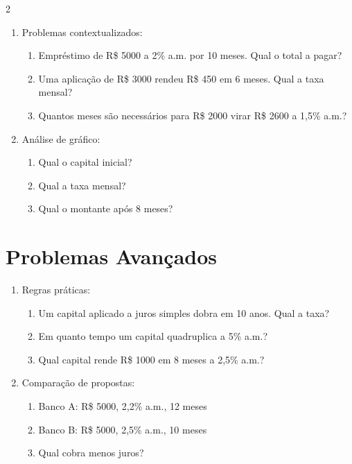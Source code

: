 \documentclass[11pt]{article}
\begin{document}
\begin{multicols}{2}
\begin{enumerate}[leftmargin=*, start=5]
\item Problemas contextualizados:
\begin{enumerate}[label=\alph*)]
\item Empréstimo de R\$ 5000 a 2\% a.m. por 10 meses. Qual o total a pagar?
\item Uma aplicação de R\$ 3000 rendeu R\$ 450 em 6 meses. Qual a taxa mensal?
\item Quantos meses são necessários para R\$ 2000 virar R\$ 2600 a 1,5\% a.m.?
\end{enumerate}

\item Análise de gráfico:
\begin{center}
\end{center}
\begin{enumerate}[label=\alph*)]
\item Qual o capital inicial?
\item Qual a taxa mensal?
\item Qual o montante após 8 meses?
\end{enumerate}

\end{enumerate}

\section*{Problemas Avançados}

\begin{enumerate}[leftmargin=*, start=9]

\item Regras práticas:
\begin{enumerate}[label=\alph*)]
\item Um capital aplicado a juros simples dobra em 10 anos. Qual a taxa?
\item Em quanto tempo um capital quadruplica a 5\% a.m.?
\item Qual capital rende R\$ 1000 em 8 meses a 2,5\% a.m.?
\end{enumerate}

\item Comparação de propostas:
\begin{enumerate}[label=\alph*)]
\item Banco A: R\$ 5000, 2,2\% a.m., 12 meses
\item Banco B: R\$ 5000, 2,5\% a.m., 10 meses
\item Qual cobra menos juros?
\end{enumerate}


\end{enumerate}
\end{multicols}
\end{document}
